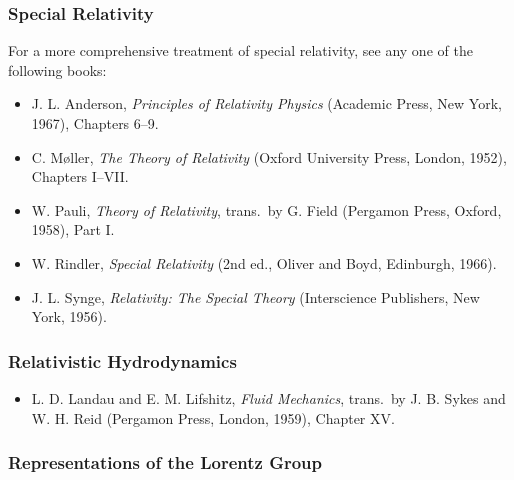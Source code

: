 

\subsubsection*{Special Relativity}

For a more comprehensive treatment of special relativity, see any one of the
following books:
\begin{itemize}
  \item[\(\square\)] J. L. Anderson, \emph{Principles of Relativity Physics}
  (Academic Press, New York, 1967), Chapters 6--9.

  \item[\(\square\)] C. M{\o}ller, \emph{The Theory of Relativity}
  (Oxford University Press, London, 1952), Chapters I--VII.

  \item[\(\square\)] W. Pauli, \emph{Theory of Relativity}, trans.\ by
  G. Field (Pergamon Press, Oxford, 1958), Part I.

  \item[\(\square\)] W. Rindler, \emph{Special Relativity}
  (2nd ed., Oliver and Boyd, Edinburgh, 1966).

  \item[\(\square\)] J. L. Synge, \emph{Relativity: The Special Theory}
  (Interscience Publishers, New York, 1956).
\end{itemize}

\subsubsection*{Relativistic Hydrodynamics}

\begin{itemize}
  \item[\(\square\)] L. D. Landau and E. M. Lifshitz,
  \emph{Fluid Mechanics}, trans.\ by J. B. Sykes and W. H. Reid
  (Pergamon Press, London, 1959), Chapter XV.
\end{itemize}

\subsubsection*{Representations of the Lorentz Group}

